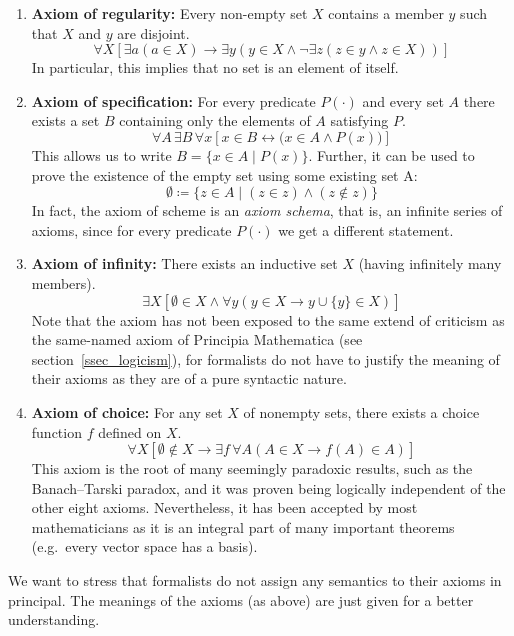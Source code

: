 \documentclass[hidelinks]{article}
\begin{document}
\begin{enumerate}
    \item \textbf{Axiom of regularity:} Every non-empty set $X$ contains a member $y$ such that $X$ and $y$ are disjoint.
\begin{equation*}
\forall X [\exists a ( a \in X) \rightarrow \exists y ( y \in X \land \lnot \exists z (z \in y \land z \in X))]
\end{equation*}
In particular, this implies that no set is an element of itself.
    \item \textbf{Axiom of specification:} For every predicate $P(\cdot)$ and every set $A$ there exists a set $B$ containing only the elements of $A$ satisfying $P$.
\begin{equation*}
\forall A\,\exists B\,\forall x[x\in B \leftrightarrow \bigl(x\in A \land P(x)\bigr)]
\end{equation*}
This allows us to write $B=\{x\in A\mid P(x)\}$. Further, it can be used to prove the existence of the empty set using some existing set A:
\begin{equation*}
\emptyset\coloneqq\{z\in A\mid (z\in z)\land(z\notin z)\}
\end{equation*}
In fact, the axiom of scheme is an \textit{axiom schema}, that is, an infinite series of axioms, since for every predicate $P(\cdot)$ we get a different statement.
    \item \textbf{Axiom of infinity:} There exists an inductive set $X$ (having infinitely many members).
\begin{equation*}
\exists X \left [\emptyset \in X \land \forall y (y \in X \rightarrow y\cup\{y\}  \in X)\right]
\end{equation*}
Note that the axiom has not been exposed to the same extend of criticism as the same-named axiom of Principia Mathematica (see section~\ref{ssec_logicism}), for formalists do not have to justify the meaning of their axioms as they are of a pure syntactic nature.
    \item \textbf{Axiom of choice:} For any set $X$ of nonempty sets, there exists a choice function $f$ defined on $X$. 
\begin{equation*}
\forall X \left[ \emptyset \notin X \rightarrow \exists f\,\forall A(A\in X\rightarrow f(A) \in A ) \right]
\end{equation*}
This axiom is the root of many seemingly paradoxic results, such as the Banach–Tarski paradox, and it was proven being logically independent of the other eight axioms. Nevertheless, it has been accepted by most mathematicians as it is an integral part of many important theorems (e.g.\ every vector space has a basis).
\end{enumerate}
\normalsize
We want to stress that formalists do not assign any semantics to their axioms in principal. The meanings of the axioms (as above) are just given for a better understanding.
\end{document}
